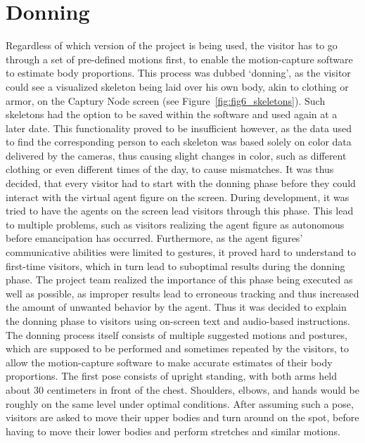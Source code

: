 \documentclass[draft,final]{vutinfth} %
\begin{document}
\section{Donning}
\label{chap:donning}

Regardless of which version of the project is being used, the \gls{visitor} has to go through a set of pre-defined motions first, to enable the motion-capture software to estimate body proportions. 
This process was dubbed ‘donning’, as the \gls{visitor} could see a visualized skeleton being laid over his own body, akin to clothing or armor, on the Captury Node screen (see Figure~\ref{fig:fig6_skeletons}). 
Such skeletons had the option to be saved within the software and used again at a later date. 
This functionality proved to be insufficient however, as the data used to find the corresponding person to each skeleton was based solely on color data delivered by the cameras, thus causing slight changes in color, such as different clothing or even different times of the day, to cause mismatches. 
It was thus decided, that every \gls{visitor} had to start with the donning phase before they could interact with the virtual \gls{agent figure} on the screen. 
During development, it was tried to have the agents on the screen lead \glspl{visitor} through this phase. 
This lead to multiple problems, such as \glspl{visitor} realizing the \gls{agent figure} as autonomous before emancipation has occurred. 
Furthermore, as the \glspl{agent figure}’ communicative abilities were limited to gestures, it proved hard to understand to first-time \glspl{visitor}, which in turn lead to suboptimal results during the donning phase. 
The project team realized the importance of this phase being executed as well as possible, as improper results lead to erroneous tracking and thus increased the amount of unwanted behavior by the agent. 
Thus it was decided to explain the donning phase to \glspl{visitor} using on-screen text and audio-based instructions. \\
The donning process itself consists of multiple suggested motions and postures, which are supposed to be performed and sometimes repeated by the \glspl{visitor}, to allow the motion-capture software to make accurate estimates of their body proportions. 
The first pose consists of upright standing, with both arms held about 30 centimeters in front of the chest. 
Shoulders, elbows, and hands would be roughly on the same level under optimal conditions. 
After assuming such a pose, \glspl{visitor} are asked to move their upper bodies and turn around on the spot, before having to move their lower bodies and perform stretches and similar motions. 
\end{document}
